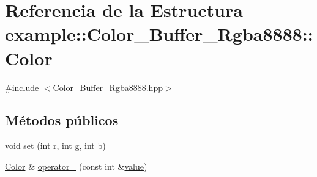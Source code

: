 \hypertarget{structexample_1_1_color___buffer___rgba8888_1_1_color}{}\section{Referencia de la Estructura example\+::Color\+\_\+\+Buffer\+\_\+\+Rgba8888\+::Color}
\label{structexample_1_1_color___buffer___rgba8888_1_1_color}


{\ttfamily \#include $<$Color\+\_\+\+Buffer\+\_\+\+Rgba8888.\+hpp$>$}

\subsection*{Métodos públicos}
\begin{DoxyCompactItemize}
\item 
void \mbox{\hyperlink{structexample_1_1_color___buffer___rgba8888_1_1_color_ab468e761b5196e508eff6cf396d50cce}{set}} (int \mbox{\hyperlink{structexample_1_1_color___buffer___rgba8888_1_1_color_a3ae8419af50bed867580b5ca28b9e254}{r}}, int \mbox{\hyperlink{structexample_1_1_color___buffer___rgba8888_1_1_color_a02b8df3c9800b6d9efab7872ead00da1}{g}}, int \mbox{\hyperlink{structexample_1_1_color___buffer___rgba8888_1_1_color_a9213fba01a28ef7dbe871fe2669a0226}{b}})
\item 
\mbox{\hyperlink{structexample_1_1_color___buffer___rgba8888_1_1_color}{Color}} \& \mbox{\hyperlink{structexample_1_1_color___buffer___rgba8888_1_1_color_ada91a7b49ff32dc823e5cf733fc94b55}{operator=}} (const int \&\mbox{\hyperlink{structexample_1_1_color___buffer___rgba8888_1_1_color_aa8c3f5e3038dd7743aab9592023418e4}{value}})
\end{DoxyCompactItemize}
